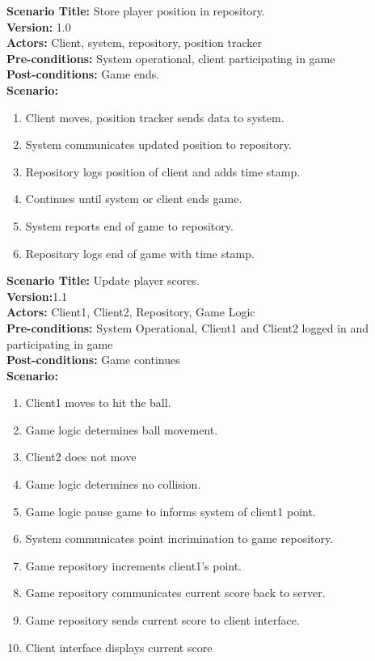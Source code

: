 \documentclass[letterpaper,12pt]{article}
\begin{document}
\noindent \textbf{Scenario Title:} Store player position in repository.\\
\textbf{Version:} 1.0\\
\textbf{Actors:} Client, system, repository, position tracker\\
\textbf{Pre-conditions:} System operational, client participating in game\\
\textbf{Post-conditions:} Game ends.\\
\textbf{Scenario:}
\begin{enumerate}
\item Client moves, position tracker sends data to system.
\item System communicates updated position to repository.
\item Repository logs position of client and adds time stamp.
\item Continues until system or client ends game.
\item System reports end of game to repository.
\item Repository logs end of game with time stamp.
\end{enumerate}


\noindent \textbf{Scenario Title:} Update player scores.\\
\textbf{Version:}1.1\\
\textbf{Actors:} Client1, Client2, Repository, Game Logic\\
\textbf{Pre-conditions:} System Operational, Client1 and Client2 logged in and participating in game \\
\textbf{Post-conditions:} Game continues\\
\textbf{Scenario:}
\begin{enumerate}
\item Client1 moves to hit the ball.
\item Game logic determines ball movement.
\item Client2 does not move 
\item Game logic determines no collision. 
\item Game logic pause game to informs system of client1 point.
\item System communicates point incrimination to game repository.
\item Game repository increments client1’s point.
\item Game repository communicates current score back to server.
\item Game repository sends current score to client interface.
\item Client interface displays current score
\end{enumerate}
\end{document}
